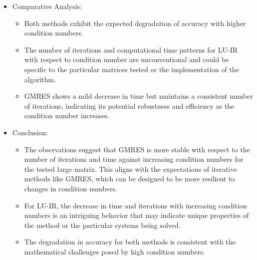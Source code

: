 \begin{enumerate}
\begin{itemize}
\begin{itemize}
\begin{itemize}
            \end{itemize}
        \end{itemize}
        \item Comparative Analysis:
        \begin{itemize}
            \item  Both methods exhibit the expected degradation of accuracy with higher condition numbers.
            \item The number of iterations and computational time patterns for LU-IR with respect to condition number are unconventional and could be specific to the particular matrices tested or the implementation of the algorithm.
            \item GMRES shows a mild decrease in time but maintains a consistent number of iterations, indicating its potential robustness and efficiency as the condition number increases.
        \end{itemize}
        \item Conclusion:
        \begin{itemize}
            \item The observations suggest that GMRES is more stable with respect to the number of iterations and time against increasing condition numbers for the tested large matrix. This aligns with the expectations of iterative methods like GMRES, which can be designed to be more resilient to changes in condition numbers.
           \item For LU-IR, the decrease in time and iterations with increasing condition numbers is an intriguing behavior that may indicate unique properties of the method or the particular systems being solved.
           \item The degradation in accuracy for both methods is consistent with the mathematical challenges posed by high condition numbers.
        \end{itemize}
        

\end{itemize}
\end{enumerate}
